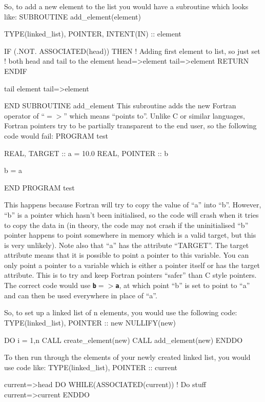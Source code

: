 \documentclass[12pt,a4paper]{article}
\newcommand{\inlinecode}[1]{{\color{warwickred} \bf\texttt{#1}}}
\newenvironment{boxverbatim}{\lboxverbatim{none}}{\endlboxverbatim}
\begin{document}
So, to add a new element to the list you would have a subroutine which looks
like:
\begin{boxverbatim}
SUBROUTINE add_element(element)

  TYPE(linked_list), POINTER, INTENT(IN) :: element

  IF (.NOT. ASSOCIATED(head)) THEN
    ! Adding first element to list, so just set
    ! both head and tail to the element
    head=>element
    tail=>element
    RETURN
  ENDIF

  tail%
  element%
  tail=>element

END SUBROUTINE add_element
\end{boxverbatim}
This subroutine adds the new Fortran operator of ``$=>$'' which means ``points
to''. Unlike C or similar languages, Fortran pointers try to be partially
transparent to the end user, so the following code would fail:
\begin{boxverbatim}
PROGRAM test

  REAL, TARGET :: a = 10.0
  REAL, POINTER :: b

  b = a

END PROGRAM test
\end{boxverbatim}

This happens because Fortran will try to copy the value of ``a'' into ``b''.
However, ``b'' is a pointer which hasn't been initialised, so the code will
crash when it tries to copy the data in (in theory, the code may not crash if
the uninitialised ``b'' pointer happens to point somewhere in memory which is
a valid target, but this is very unlikely). Note also that ``a'' has the
attribute ``TARGET''. The target attribute means that it is possible to point
a pointer to this variable. You can only point a pointer to a variable which
is either a pointer itself or has the target attribute. This is to try and
keep Fortran pointers ``safer'' than C style pointers. The correct code would
use \inlinecode{b$=>$a}, at which point ``b'' is set to point to ``a'' and
can then be used everywhere in place of ``a''.

So, to set up a linked list of n elements, you would use the following code:
\begin{boxverbatim}
TYPE(linked_list), POINTER :: new
NULLIFY(new)

DO i = 1,n
  CALL create_element(new)
  CALL add_element(new)
ENDDO
\end{boxverbatim}

To then run through the elements of your newly created linked list, you would
use code like:
\begin{boxverbatim}
TYPE(linked_list), POINTER :: current

current=>head
DO WHILE(ASSOCIATED(current))
  ! Do stuff
  current=>current%
ENDDO
\end{boxverbatim}
\end{document}
